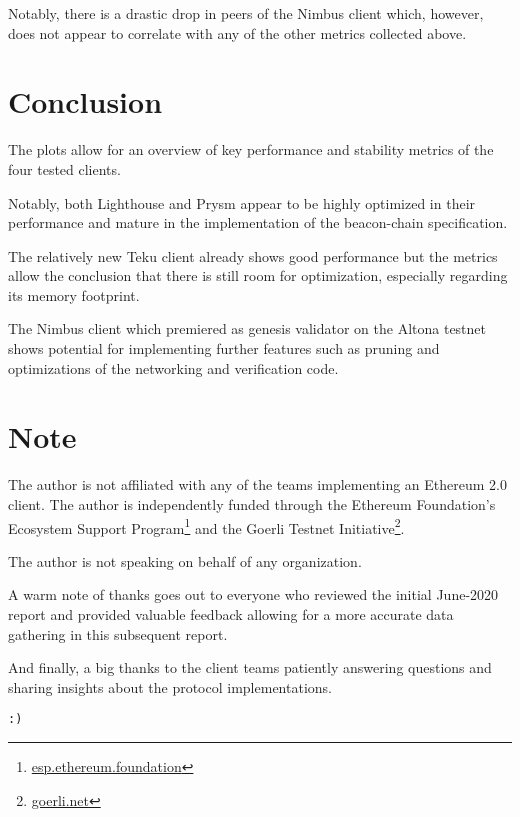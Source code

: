\documentclass[twoside,twocolumn]{article}
\begin{document}
Notably, there is a drastic drop in peers of the Nimbus client which, however, does not appear to correlate with any of the other metrics collected above.\par

\section{Conclusion}
The plots allow for an overview of key performance and stability metrics of the four tested clients.\par

Notably, both Lighthouse and Prysm appear to be highly optimized in their performance and mature in the implementation of the beacon-chain specification.\par

The relatively new Teku client already shows good performance but the metrics allow the conclusion that there is still room for optimization, especially regarding its memory footprint.\par

The Nimbus client which premiered as genesis validator on the Altona testnet shows potential for implementing further features such as pruning and optimizations of the networking and verification code.\par

\vspace{\fill}

\section*{Note}
The author is not affiliated with any of the teams implementing an Ethereum 2.0 client. The author is independently funded through the Ethereum Foundation's Ecosystem Support Program\footnote{\href{https://esp.ethereum.foundation}{esp.ethereum.foundation}} and the Goerli Testnet Initiative\footnote{\href{https://goerli.net}{goerli.net}}.\par

The author is not speaking on behalf of any organization.\par

A warm note of thanks goes out to everyone who reviewed the initial June-2020 report and provided valuable feedback allowing for a more accurate data gathering in this subsequent report.\par

And finally, a big thanks to the client teams patiently answering questions and sharing insights about the protocol implementations.

\texttt{:)}
\end{document}
